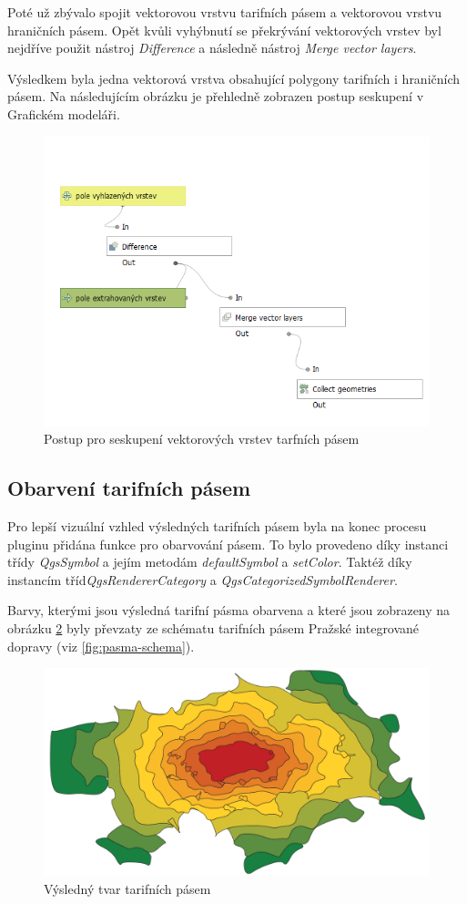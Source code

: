 Poté už zbývalo spojit vektorovou vrstvu tarifních pásem a vektorovou vrstvu hraničních pásem. Opět kvůli vyhýbnutí se 
překrývání vektorových vrstev byl nejdříve použit nástroj \textit{Difference} a následně nástroj  \textit{Merge vector layers}.

Výsledkem byla jedna vektorová vrstva obsahující polygony tarifních i hraničních pásem. Na následujícím obrázku
je přehledně zobrazen postup seskupení v Grafickém modeláři.

\begin{figure}[H] \centering
    \includegraphics[width=400pt]{./pictures/postup-collecting.png}
    \caption[Postup pro seskupení vektorových vrstev tarfních pásem]{Postup pro seskupení vektorových vrstev tarfních pásem}
	\label{fig:postup-collecting}              
\end{figure}

\subsection{Obarvení tarifních pásem}

Pro lepší vizuální vzhled výsledných tarifních pásem byla na konec procesu pluginu přidána funkce
pro obarvování pásem. To bylo provedeno díky instanci třídy \textit{QgsSymbol} a jejím metodám 
\textit{defaultSymbol} a \textit{setColor}. Taktéž díky instancím tříd\textit{QgsRendererCategory}
a \textit{QgsCategorizedSymbolRenderer}.

Barvy, kterými jsou výsledná tarifní pásma obarvena a které jsou zobrazeny na obrázku \ref{fig:vysledek} byly převzaty
ze schématu tarifních pásem Pražské integrované dopravy (viz \ref{fig:pasma-schema}).  

\begin{figure}[H] \centering
    \includegraphics[width=400pt]{./pictures/vysledek.png}
    \caption[Výsledný tvar tarifních pásem]{Výsledný tvar tarifních pásem}
	\label{fig:vysledek}              
\end{figure}